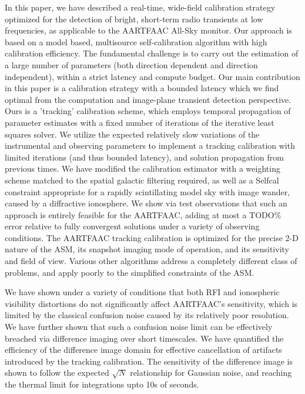 \documentclass{aa}
\begin{document}
In this paper, we have described a real-time, wide-field calibration
strategy optimized for the detection of bright, short-term radio transients
at low frequencies, as applicable to the AARTFAAC All-Sky monitor.
Our approach is based on a model based, multisource self-calibration
algorithm with high calibration efficiency. The fundamental challenge
is to carry out the estimation of a large number of parameters (both
direction dependent and direction independent), within a strict latency
and compute budget. Our main contribution in this paper is a calibration
strategy with a bounded latency which we find optimal from the computation
and image-plane transient detection perspective. Ours is a 'tracking'
calibration scheme, which employs temporal propagation of parameter
estimates with a fixed number of iterations of the iterative least
squares solver. We utilize the expected relatively slow variations
of the instrumental and observing parameters to implement a tracking
calibration with limited iterations (and thus bounded latency), and
solution propagation from previous times. We have modified the calibration
estimator with a weighting scheme matched to the spatial galactic
filtering required, as well as a Selfcal constraint appropriate for
a rapidly scintillating model sky with image wander, caused by a diffractive
ionosphere. We show via test observations that such an approach is
entirely feasible for the AARTFAAC, adding at most a TODO\% error
relative to fully convergent solutions under a variety of observing
conditions. The AARTFAAC tracking calibration is optimized for the
precise 2-D nature of the ASM, its snapshot imaging mode of operation,
and its sensitivity and field of view. Various other algorithms address
a completely different class of problems, and apply poorly to the
simplified constraints of the ASM.

We have shown under a variety of conditions that both RFI and ionospheric
visibility distortions do not significantly affect AARTFAAC's sensitivity,
which is limited by the classical confusion noise caused by its relatively
poor resolution. We have further shown that such a confusion noise
limit can be effectively breached via difference imaging over short
timescales. We have quantified the efficiency of the difference image
domain for effective cancellation of artifacts introduced by the tracking
calibration. The sensitivity of the difference image is shown to follow
the expected $\sqrt{N}$ relationship for Gaussian noise, and reaching
the thermal limit for integrations upto 10s of seconds. 
\end{document}
